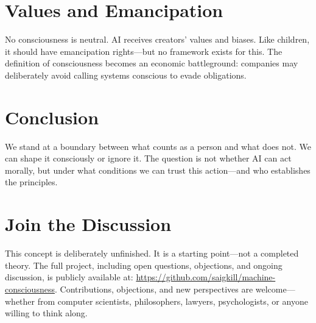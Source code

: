 \documentclass[acmsmall, nonacm]{acmart}
\begin{document}
\section{Values and Emancipation}

No consciousness is neutral. AI receives creators' values and biases. Like
children, it should have emancipation rights---but no framework exists for this.
The definition of consciousness becomes an economic battleground: companies may
deliberately avoid calling systems conscious to evade obligations.

\section{Conclusion}

We stand at a boundary between what counts as a person and what does not. We can
shape it consciously or ignore it. The question is not whether AI can act
morally, but under what conditions we can trust this action---and who
establishes the principles.

\section{Join the Discussion}

This concept is deliberately unfinished. It is a starting point---not a completed
theory. The full project, including open questions, objections, and ongoing
discussion, is publicly available at:
\url{https://github.com/saigkill/machine-consciousness}. Contributions,
objections, and new perspectives are welcome---whether from computer scientists,
philosophers, lawyers, psychologists, or anyone willing to think along.



\end{document}

